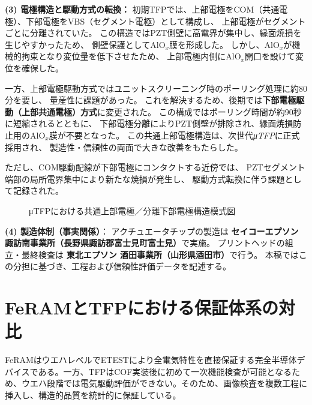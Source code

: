 \documentclass[conference]{IEEEtran}
\begin{document}
\medskip
\noindent
\textbf{(3) 電極構造と駆動方式の転換：}
初期TFPでは、上部電極をCOM（共通電極）、下部電極をVBS（セグメント電極）として構成し、
上部電極がセグメントごとに分離されていた。
この構造ではPZT側壁に高電界が集中し、縁面焼損を生じやすかったため、
側壁保護としてAlO$_x$膜を形成した。
しかし、AlO$_x$が機械的拘束となり変位量を低下させたため、
上部電極内側にAlO$_x$開口を設けて変位を確保した。

一方、上部電極駆動方式ではユニットスクリーニング時のポーリング処理に約80分を要し、
量産性に課題があった。
これを解決するため、後期では\textbf{下部電極駆動（上部共通電極）方式}に変更された。
この構成ではポーリング時間が約90秒に短縮されるとともに、
下部電極分離によりPZT側壁が排除され、縁面焼損防止用のAlO$_x$膜が不要となった。
この共通上部電極構造は、次世代\textit{μTFP}に正式採用され、
製造性・信頼性の両面で大きな改善をもたらした。

ただし、COM駆動配線が下部電極にコンタクトする近傍では、
PZTセグメント端部の局所電界集中により新たな焼損が発生し、
駆動方式転換に伴う課題として記録された。

\begin{figure}[!t]
\centering
{}
\caption{μTFPにおける共通上部電極／分離下部電極構造模式図}
\label{fig:utfp_structure}
\end{figure}

\medskip
\noindent
\textbf{(4) 製造体制（事実関係）}：
アクチュエータチップの製造は
\textbf{セイコーエプソン 諏訪南事業所（長野県諏訪郡富士見町富士見）}で実施。
プリントヘッドの組立・最終検査は
\textbf{東北エプソン 酒田事業所（山形県酒田市）}で行う。
本稿ではこの分担に基づき、工程および信頼性評価データを記述する。

\section{FeRAMとTFPにおける保証体系の対比}
FeRAMはウエハレベルでETESTにより全電気特性を直接保証する完全半導体デバイスである。一方、TFPはCOF実装後に初めて一次機能検査が可能となるため、ウエハ段階では電気駆動評価ができない。そのため、画像検査を複数工程に挿入し、構造的品質を統計的に保証している。
\end{document}
